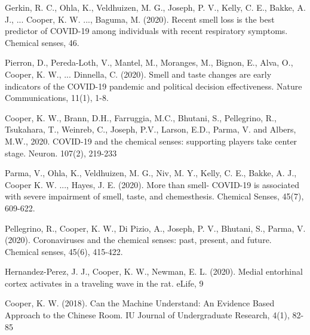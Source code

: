 \documentclass[10pt]{article}
\begin{document}
\begin{bibenum}
    \item   Gerkin, R. C., Ohla, K., Veldhuizen, M. G., Joseph, P. V., Kelly, C. E., Bakke, A. J., ... Cooper, K. W. ..., Baguma, M. (2020). Recent smell loss is the best predictor of COVID-19 among individuals with recent respiratory symptoms. Chemical senses, 46.

    \item   Pierron, D., Pereda-Loth, V., Mantel, M., Moranges, M., Bignon, E., Alva, O.,  Cooper, K. W., ... Dinnella, C. (2020). Smell and taste changes are early indicators of the COVID-19 pandemic and political decision effectiveness. Nature Communications, 11(1), 1-8.

    \item Cooper, K. W., Brann, D.H., Farruggia, M.C., Bhutani, S., Pellegrino, R., Tsukahara, T., Weinreb, C., Joseph, P.V., Larson, E.D., Parma, V. and Albers, M.W., 2020. COVID-19 and the chemical senses: supporting players take center stage. Neuron. 107(2), 219-233

    \item Parma, V., Ohla, K., Veldhuizen, M. G., Niv, M. Y., Kelly, C. E., Bakke, A. J., Cooper K. W. ..., Hayes, J. E. (2020). More than smell- COVID-19 is associated with severe impairment of smell, taste, and chemesthesis. Chemical Senses, 45(7), 609-622.

    \item Pellegrino, R., Cooper, K. W., Di Pizio, A., Joseph, P. V., Bhutani, S., Parma, V. (2020). Coronaviruses and the chemical senses: past, present, and future. Chemical senses, 45(6), 415-422.

    \item Hernandez-Perez, J. J., Cooper, K. W., Newman, E. L. (2020). Medial entorhinal cortex activates in a traveling wave in the rat. eLife, 9

    \item Cooper, K. W. (2018). Can the Machine Understand: An Evidence Based Approach to the Chinese Room. IU Journal of Undergraduate Research, 4(1), 82-85

\end{bibenum}


\vspace{0.1in}
\end{document}

